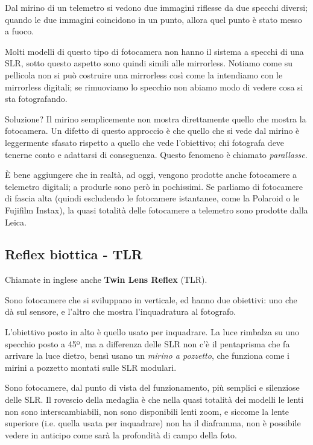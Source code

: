 Dal mirino di un telemetro si vedono due immagini riflesse da due specchi diversi; quando le due immagini coincidono in un punto, allora quel punto è stato messo a fuoco.

Molti modelli di questo tipo di fotocamera non hanno il sistema a specchi di una SLR, sotto questo aspetto sono quindi simili alle mirrorless.
Notiamo come su pellicola non si può costruire una mirrorless così come la intendiamo con le mirrorless digitali; se rimuoviamo lo specchio non abiamo modo di vedere cosa si sta fotografando.

Soluzione? Il mirino semplicemente non mostra direttamente quello che mostra la fotocamera. Un difetto di questo approccio è che quello che si vede dal mirino è leggermente sfasato rispetto a quello che vede l'obiettivo; chi fotografa deve tenerne conto e adattarsi di conseguenza. Questo fenomeno è chiamato \textit{parallasse}.

È bene aggiungere che in realtà, ad oggi, vengono prodotte anche fotocamere a telemetro digitali; a produrle sono però in pochissimi.
Se parliamo di fotocamere di fascia alta (quindi escludendo le fotocamere istantanee, come la Polaroid o le Fujifilm Instax), la quasi totalità delle fotocamere a telemetro sono prodotte dalla Leica.


\subsection{Reflex biottica - TLR} \label{subsec:tlr}
Chiamate in inglese anche \textbf{Twin Lens Reflex} (TLR).

Sono fotocamere che si sviluppano in verticale, ed hanno due obiettivi: uno che dà sul sensore, e l'altro che mostra l'inquadratura al fotografo.

L'obiettivo posto in alto è quello usato per inquadrare. La luce rimbalza su uno specchio posto a 45º, ma a differenza delle SLR non c'è il pentaprisma che fa arrivare la luce dietro, bensì usano un \textit{mirino a pozzetto}, che funziona come i mirini a pozzetto montati sulle SLR modulari.

Sono fotocamere, dal punto di vista del funzionamento, più semplici e silenziose delle SLR.
Il rovescio della medaglia è che nella quasi totalità dei modelli le lenti non sono interscambiabili, non sono disponibili lenti zoom, e siccome la lente superiore (i.e. quella usata per inquadrare) non ha il diaframma, non è possibile vedere in anticipo come sarà la profondità di campo della foto.

